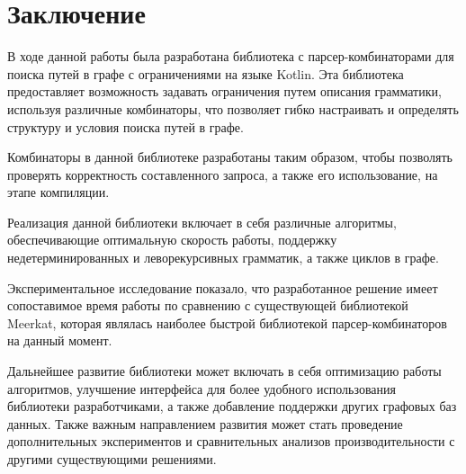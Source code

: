 \chapter*{Заключение}                       %

В ходе данной работы была разработана библиотека с парсер-комбинаторами для поиска путей в графе с ограничениями на языке Kotlin. Эта библиотека предоставляет возможность задавать ограничения путем описания грамматики, используя различные комбинаторы, что позволяет гибко настраивать и определять структуру и условия поиска путей в графе.

Комбинаторы в данной библиотеке разработаны таким образом, чтобы позволять проверять корректность составленного запроса, а также его использование, на этапе компиляции.

Реализация данной библиотеки включает в себя различные алгоритмы, обеспечивающие оптимальную скорость работы, поддержку недетерминированных и леворекурсивных грамматик, а также циклов в графе. 

Экспериментальное исследование показало, что разработанное решение имеет сопоставимое время работы по сравнению с существующей библиотекой Meerkat, которая являлась наиболее быстрой библиотекой парсер-комбинаторов на данный момент. 

Дальнейшее развитие библиотеки может включать в себя оптимизацию работы алгоритмов, улучшение интерфейса для более удобного использования библиотеки разработчиками, а также добавление поддержки других графовых баз данных. Также важным направлением развития может стать проведение дополнительных экспериментов и сравнительных анализов производительности с другими существующими решениями.

